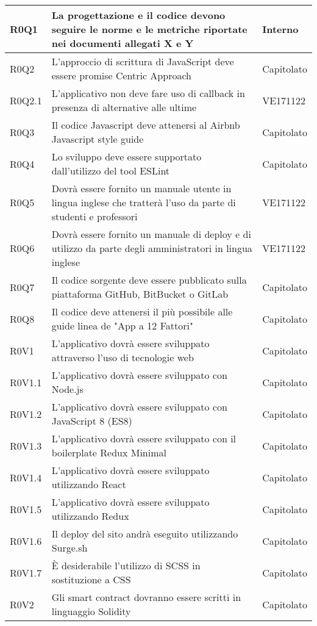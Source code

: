 \documentclass[AnalisiDeiRequisiti.tex]{subfiles}
\begin{document}
\begin{longtable}[H]{|p{2cm}|p{5cm}|p{5cm}|}
	R0Q1 &  La progettazione e il codice devono seguire le norme e le metriche riportate nei documenti allegati X e Y & Interno \\ \hline
	R0Q2 &  L'approccio di scrittura di JavaScript deve essere promise Centric Approach & Capitolato \\ \hline
	R0Q2.1 &  L'applicativo non deve fare uso di callback in presenza di alternative alle ultime & VE171122 \\ \hline
	R0Q3 &  Il codice Javascript deve attenersi al Airbnb Javascript style guide & Capitolato \\ \hline
	R0Q4 &  Lo sviluppo deve essere supportato dall'utilizzo del tool ESLint & Capitolato \\ \hline
	R0Q5 &  Dovrà essere fornito un manuale utente in lingua inglese che tratterà l'uso da parte di studenti e professori & VE171122 \\ \hline
	R0Q6 &  Dovrà essere fornito un manuale di deploy e di utilizzo da parte degli amministratori in lingua inglese & VE171122 \\ \hline
	R0Q7 &  Il codice sorgente deve essere pubblicato sulla piattaforma GitHub, BitBucket o GitLab & Capitolato \\ \hline
	R0Q8 &  Il codice deve attenersi il più possibile alle guide linea de "App a 12 Fattori" & Capitolato \\ \hline
	R0V1 &  L'applicativo dovrà essere sviluppato attraverso l'uso di tecnologie web & Capitolato \\ \hline
	R0V1.1 &  L'applicativo dovrà essere sviluppato con Node.js & Capitolato \\ \hline
	R0V1.2 &  L'applicativo dovrà essere sviluppato con JavaScript 8 (ES8) & Capitolato \\ \hline
	R0V1.3 &  L'applicativo dovrà essere sviluppato con il boilerplate Redux Minimal & Capitolato \\ \hline
	R0V1.4 &  L'applicativo dovrà essere sviluppato utilizzando React & Capitolato \\ \hline
	R0V1.5 &  L'applicativo dovrà essere sviluppato utilizzando Redux & Capitolato \\ \hline
	R0V1.6 &  Il deploy del sito andrà eseguito utilizzando Surge.sh & Capitolato \\ \hline
	R0V1.7 &  È desiderabile l'utilizzo di SCSS in sostituzione a CSS & Capitolato \\ \hline
	R0V2 &  Gli smart contract dovranno essere scritti in linguaggio Solidity & Capitolato \\ \hline

\end{longtable}
\end{document}
